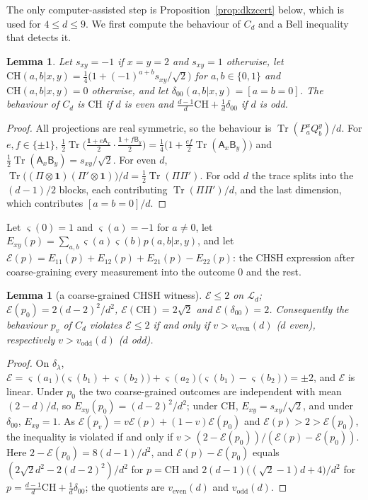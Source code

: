 \documentclass[11pt]{amsart}
\newtheorem{lemma}[theorem]{Lemma}
\theoremstyle{definition}
\theoremstyle{remark}
\numberwithin{equation}{section}
\newcommand{\Tr}{\operatorname{Tr}}
\newcommand{\one}{\mathbf{1}}
\newcommand{\cL}{\mathcal{L}}
\newcommand{\veven}{v_{\mathrm{even}}}
\newcommand{\vodd}{v_{\mathrm{odd}}}
\newcommand{\CH}{\mathrm{CH}}
\begin{document}
The only computer-assisted step is Proposition~\ref{prop:dkzcert} below, which is used for $4\le d\le9$. We first
compute the behaviour of $C_d$ and a Bell inequality that detects it.

\begin{lemma}\label{lem:Cbeh}
Let $s_{xy}=-1$ if $x=y=2$ and $s_{xy}=1$ otherwise, let $\CH(a,b|x,y)=\frac14\bigl(1+(-1)^{a+b}s_{xy}/\sqrt2\bigr)$ for
$a,b\in\{0,1\}$ and $\CH(a,b|x,y)=0$ otherwise, and let $\delta_{00}(a,b|x,y)=[a=b=0]$. The behaviour of $C_d$ is $\CH$
if $d$ is even and $\frac{d-1}d\CH+\frac1d\delta_{00}$ if $d$ is odd.
\end{lemma}

\begin{proof}
All projections are real symmetric, so the behaviour is $\Tr(P^x_aQ^y_b)/d$. For $e,f\in\{\pm1\}$,
$\frac12\Tr\bigl(\frac{\one+e\mathsf A_x}2\cdot\frac{\one+f\mathsf B_y}2\bigr)=\frac14\bigl(1+\frac{ef}2\Tr(\mathsf A_x\mathsf B_y)\bigr)$
and $\frac12\Tr(\mathsf A_x\mathsf B_y)=s_{xy}/\sqrt2$. For even $d$,
$\Tr\bigl((\Pi\otimes\one)(\Pi'\otimes\one)\bigr)/d=\frac12\Tr(\Pi\Pi')$. For odd $d$ the trace splits into the
$(d-1)/2$ blocks, each contributing $\Tr(\Pi\Pi')/d$, and the last dimension, which contributes $[a=b=0]/d$.
\end{proof}

Let $\varsigma(0)=1$ and $\varsigma(a)=-1$ for $a\ne0$, let $E_{xy}(p)=\sum_{a,b}\varsigma(a)\varsigma(b)p(a,b|x,y)$, and
let $\mathcal E(p)=E_{11}(p)+E_{12}(p)+E_{21}(p)-E_{22}(p)$: the CHSH expression after coarse-graining every measurement
into the outcome $0$ and the rest.

\begin{lemma}[a coarse-grained CHSH witness]\label{lem:witness}
$\mathcal E\le2$ on $\cL_d$; $\mathcal E(p_0)=2(d-2)^2/d^2$, $\mathcal E(\CH)=2\sqrt2$ and $\mathcal E(\delta_{00})=2$.
Consequently the behaviour $p_v$ of $C_d$ violates $\mathcal E\le2$ if and only if $v>\veven(d)$ ($d$ even),
respectively $v>\vodd(d)$ ($d$ odd).
\end{lemma}

\begin{proof}
On $\delta_\lambda$, $\mathcal E=\varsigma(a_1)\bigl(\varsigma(b_1)+\varsigma(b_2)\bigr)+\varsigma(a_2)\bigl(\varsigma(b_1)-\varsigma(b_2)\bigr)=\pm2$,
and $\mathcal E$ is linear. Under $p_0$ the two coarse-grained outcomes are independent with mean $(2-d)/d$, so
$E_{xy}(p_0)=(d-2)^2/d^2$; under $\CH$, $E_{xy}=s_{xy}/\sqrt2$, and under $\delta_{00}$, $E_{xy}=1$. As
$\mathcal E(p_v)=v\mathcal E(p)+(1-v)\mathcal E(p_0)$ and $\mathcal E(p)>2>\mathcal E(p_0)$, the inequality is violated if
and only if $v>(2-\mathcal E(p_0))/(\mathcal E(p)-\mathcal E(p_0))$. Here $2-\mathcal E(p_0)=8(d-1)/d^2$, and
$\mathcal E(p)-\mathcal E(p_0)$ equals $(2\sqrt2d^2-2(d-2)^2)/d^2$ for $p=\CH$ and $2(d-1)\bigl((\sqrt2-1)d+4\bigr)/d^2$
for $p=\frac{d-1}d\CH+\frac1d\delta_{00}$; the quotients are $\veven(d)$ and $\vodd(d)$.
\end{proof}
\end{document}
